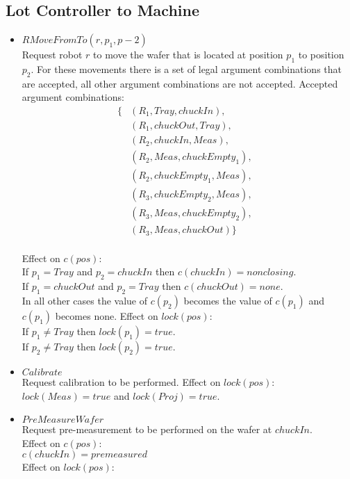 \subsection{Lot Controller to Machine}
\begin{itemize}
\item $RMoveFromTo(r, p_1, p-2)$
\\Request robot $r$ to move the wafer that is located at position $p_1$ to position $p_2$. For these movements there is a set of legal argument combinations that are accepted, all other argument combinations are not accepted. Accepted argument combinations: 
\begin{align*}
\{ & (R_1, Tray, chuckIn),&\\
& (R_1, chuckOut, Tray),&\\
&(R_2, chuckIn, Meas),&\\
&(R_2, Meas, chuckEmpty_1),&\\
&(R_2, chuckEmpty_1, Meas),&\\
&(R_3, chuckEmpty_2, Meas),&\\
&(R_3, Meas, chuckEmpty_2),&\\
&(R_3, Meas, chuckOut)\}
\end{align*}\\
Effect on $c(pos)$:\\
If $p_1 = Tray$ and $p_2 = chuckIn$ then $c(chuckIn) = nonclosing$.\\
If $p_1 = chuckOut$ and $p_2 = Tray$ then $c(chuckOut) = none$.\\
In all other cases the value of $c(p_2)$ becomes the value of $c(p_1)$ and $c(p_1)$ becomes none.
Effect on $lock(pos)$:\\
If $p_1 \neq Tray$ then $lock(p_1) = true$.\\
If $p_2 \neq Tray$ then $lock(p_2) = true$.\\
\item $Calibrate$
\\Request calibration to be performed.
Effect on $lock(pos)$:\\
$lock(Meas) = true$ and $lock(Proj) = true$.\\
\item $PreMeasureWafer$
\\Request pre-measurement to be performed on the wafer at $chuckIn$.\\
Effect on $c(pos)$:\\
$c(chuckIn) = premeasured$\\
Effect on $lock(pos)$:\\

\end{itemize}
